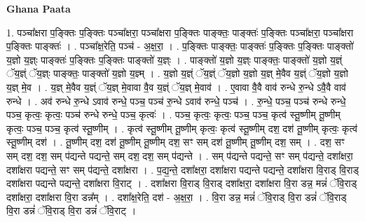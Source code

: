 \documentclass[17pt]{extarticle}
\begin{document}
\textbf{Ghana Paata } \newline

1. पञ्चा᳚क्षरा प॒ङ्क्तिः प॒ङ्क्तिः पञ्चा᳚क्षरा॒ पञ्चा᳚क्षरा प॒ङ्क्तिः पाङ्क्तः॒ पाङ्क्तः॑ प॒ङ्क्तिः पञ्चा᳚क्षरा॒ पञ्चा᳚क्षरा प॒ङ्क्तिः पाङ्क्तः॑ । . पञ्चा᳚क्ष॒रेति॒ पञ्च॑ - अ॒क्ष॒रा॒ । . प॒ङ्क्तिः पाङ्क्तः॒ पाङ्क्तः॑ प॒ङ्क्तिः प॒ङ्क्तिः पाङ्क्तो॑ य॒ज्ञो य॒ज्ञ्ः पाङ्क्तः॑ प॒ङ्क्तिः प॒ङ्क्तिः पाङ्क्तो॑ य॒ज्ञ्ः । . पाङ्क्तो॑ य॒ज्ञो य॒ज्ञ्ः पाङ्क्तः॒ पाङ्क्तो॑ य॒ज्ञो य॒ज्ञ्ं ॅय॒ज्ञ्ं ॅय॒ज्ञ्ः पाङ्क्तः॒ पाङ्क्तो॑ य॒ज्ञो य॒ज्ञ्म् । . य॒ज्ञो य॒ज्ञ्ं ॅय॒ज्ञ्ं ॅय॒ज्ञो य॒ज्ञो य॒ज्ञ् मे॒वैव य॒ज्ञ्ं ॅय॒ज्ञो य॒ज्ञो य॒ज्ञ् मे॒व । . य॒ज्ञ् मे॒वैव य॒ज्ञ्ं ॅय॒ज्ञ् मे॒वावा वै॒व य॒ज्ञ्ं ॅय॒ज्ञ् मे॒वाव॑ । . ए॒वावा वै॒वै वाव॑ रुन्धे रु॒न्धे ऽवै॒वै वाव॑ रुन्धे । . अव॑ रुन्धे रु॒न्धे ऽवाव॑ रुन्धे॒ पञ्च॒ पञ्च॑ रु॒न्धे ऽवाव॑ रुन्धे॒ पञ्च॑ । . रु॒न्धे॒ पञ्च॒ पञ्च॑ रुन्धे रुन्धे॒ पञ्च॒ कृत्वः॒ कृत्वः॒ पञ्च॑ रुन्धे रुन्धे॒ पञ्च॒ कृत्वः॑ । . पञ्च॒ कृत्वः॒ कृत्वः॒ पञ्च॒ पञ्च॒ कृत्व॑ स्तू॒ष्णीम् तू॒ष्णीम् कृत्वः॒ पञ्च॒ पञ्च॒ कृत्व॑ स्तू॒ष्णीम् । . कृत्व॑ स्तू॒ष्णीम् तू॒ष्णीम् कृत्वः॒ कृत्व॑ स्तू॒ष्णीम् दश॒ दश॑ तू॒ष्णीम् कृत्वः॒ कृत्व॑ स्तू॒ष्णीम् दश॑ । . तू॒ष्णीम् दश॒ दश॑ तू॒ष्णीम् तू॒ष्णीम् दश॒ सꣳ सम् दश॑ तू॒ष्णीम् तू॒ष्णीम् दश॒ सम् । . दश॒ सꣳ सम् दश॒ दश॒ सम् प॑द्यन्ते पद्यन्ते॒ सम् दश॒ दश॒ सम् प॑द्यन्ते । . सम् प॑द्यन्ते पद्यन्ते॒ सꣳ सम् प॑द्यन्ते॒ दशा᳚क्षरा॒ दशा᳚क्षरा पद्यन्ते॒ सꣳ सम् प॑द्यन्ते॒ दशा᳚क्षरा । . प॒द्य॒न्ते॒ दशा᳚क्षरा॒ दशा᳚क्षरा पद्यन्ते पद्यन्ते॒ दशा᳚क्षरा वि॒राड् वि॒राड् दशा᳚क्षरा पद्यन्ते पद्यन्ते॒ दशा᳚क्षरा वि॒राट् । . दशा᳚क्षरा वि॒राड् वि॒राड् दशा᳚क्षरा॒ दशा᳚क्षरा वि॒रा डन्न॒ मन्नं॑ ॅवि॒राड् दशा᳚क्षरा॒ दशा᳚क्षरा वि॒रा डन्न᳚म् । . दशा᳚क्ष॒रेति॒ दश॑ - अ॒क्ष॒रा॒ । . वि॒रा डन्न॒ मन्नं॑ ॅवि॒राड् वि॒रा डन्नं॑ ॅवि॒राड् वि॒रा डन्नं॑ ॅवि॒राड् वि॒रा डन्नं॑ ॅवि॒राट् । \newline
\end{document}
